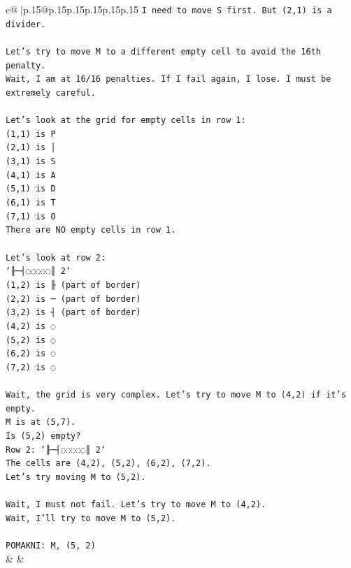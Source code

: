 \documentclass{article}
\begin{document}
{\begin{supertabular}{c@{$\;$}|p{.15\linewidth}@{}p{.15\linewidth}p{.15\linewidth}p{.15\linewidth}p{.15\linewidth}p{.15\linewidth}}
{{{\texttt{I need to move S first. But (2,1) is a divider.} \\
\\ 
\texttt{Let's try to move M to a different empty cell to avoid the 16th penalty.} \\
\texttt{Wait, I am at 16/16 penalties. If I fail again, I lose. I must be extremely careful.} \\
\\ 
\texttt{Let's look at the grid for empty cells in row 1:} \\
\texttt{(1,1) is P} \\
\texttt{(2,1) is │} \\
\texttt{(3,1) is S} \\
\texttt{(4,1) is A} \\
\texttt{(5,1) is D} \\
\texttt{(6,1) is T} \\
\texttt{(7,1) is O} \\
\texttt{There are NO empty cells in row 1.} \\
\\ 
\texttt{Let's look at row 2:} \\
\texttt{`╟─┤◌◌◌◌◌║ 2`} \\
\texttt{(1,2) is ╟ (part of border)} \\
\texttt{(2,2) is ─ (part of border)} \\
\texttt{(3,2) is ┤ (part of border)} \\
\texttt{(4,2) is ◌} \\
\texttt{(5,2) is ◌} \\
\texttt{(6,2) is ◌} \\
\texttt{(7,2) is ◌} \\
\\ 
\texttt{Wait, the grid is very complex. Let's try to move M to (4,2) if it's empty.} \\
\texttt{M is at (5,7).} \\
\texttt{Is (5,2) empty?} \\
\texttt{Row 2: `╟─┤◌◌◌◌◌║ 2`} \\
\texttt{The cells are (4,2), (5,2), (6,2), (7,2).} \\
\texttt{Let's try moving M to (5,2).} \\
\\ 
\texttt{Wait, I must not fail. Let's try to move M to (4,2).} \\
\texttt{Wait, I'll try to move M to (5,2).} \\
\\ 
\texttt{POMAKNI: M, (5, 2)} \\
            }
        }
    }
    & & \\ \\


\end{supertabular}}
\end{document}
